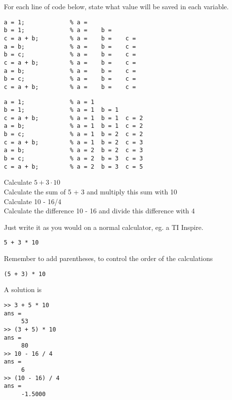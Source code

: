 \begin{ex}
For each line of code below, state what value will be saved in each variable.
\begin{verbatim}
a = 1;             % a = 
b = 1;             % a =    b = 
c = a + b;         % a =    b =    c = 
a = b;             % a =    b =    c = 
b = c;             % a =    b =    c = 
c = a + b;         % a =    b =    c = 
a = b;             % a =    b =    c = 
b = c;             % a =    b =    c = 
c = a + b;         % a =    b =    c = 
\end{verbatim}
\begin{sol}
\begin{verbatim}
a = 1;             % a = 1
b = 1;             % a = 1  b = 1 
c = a + b;         % a = 1  b = 1  c = 2
a = b;             % a = 1  b = 1  c = 2
b = c;             % a = 1  b = 2  c = 2
c = a + b;         % a = 1  b = 2  c = 3
a = b;             % a = 2  b = 2  c = 3
b = c;             % a = 2  b = 3  c = 3
c = a + b;         % a = 2  b = 3  c = 5
\end{verbatim}
\end{sol}
\end{ex}



\begin{ex}
Calculate $5 + 3 \cdot 10$\\
Calculate the sum of 5 + 3 and multiply this sum with 10\\
Calculate 10 - 16/4\\
Calculate the difference 10 - 16 and divide this difference with 4
\begin{hint}
Just write it as you would on a normal calculator, eg. a TI Inspire.
\begin{verbatim}
5 + 3 * 10
\end{verbatim}
\end{hint}
\begin{secondhint}
Remember to add parentheses, to control the order of the calculations
\begin{verbatim}
(5 + 3) * 10
\end{verbatim}
\end{secondhint}
\begin{sol}
A solution is
\begin{verbatim}
>> 3 + 5 * 10
ans = 
     53
>> (3 + 5) * 10
ans = 
     80
>> 10 - 16 / 4
ans = 
     6
>> (10 - 16) / 4
ans = 
     -1.5000
\end{verbatim}
\end{sol}
\end{ex}
\known{+, -, *, /}

